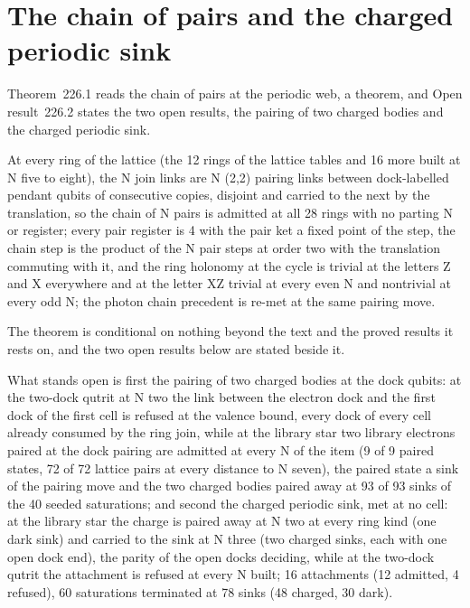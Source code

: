 \section{The chain of pairs and the charged periodic sink}\label{mod:XII-3-chain-of-pairs-and-the-charged-periodic-sink}
\label{narr:open:12-3}Theorem~226.1 reads the chain of pairs at the periodic web, a theorem, and Open result~226.2 states the two open results, the pairing of two charged bodies and the charged periodic sink.
\begin{chtheorem}\label{box:XII-3-chain-of-pairs-and-the-charged-periodic-sink:1}
At every ring of the lattice (the 12 rings of the lattice tables and 16 more built at N five to eight), the N join links are N (2,2) pairing links between dock-labelled pendant qubits of consecutive copies, disjoint and carried to the next by the translation, so the chain of N pairs is admitted at all 28 rings with no parting N or register; every pair register is 4 with the pair ket a fixed point of the step, the chain step is the product of the N pair steps at order two with the translation commuting with it, and the ring holonomy at the cycle is trivial at the letters Z and X everywhere and at the letter XZ trivial at every even N and nontrivial at every odd N; the photon chain precedent is re-met at the same pairing move.
\end{chtheorem}
The theorem is conditional on nothing beyond the text and the proved results it rests on, and the two open results below are stated beside it.
\begin{chwall}\label{box:XII-3-chain-of-pairs-and-the-charged-periodic-sink:2}
What stands open is first the pairing of two charged bodies at the dock qubits: at the two-dock qutrit at N two the link between the electron dock and the first dock of the first cell is refused at the valence bound, every dock of every cell already consumed by the ring join, while at the library star two library electrons paired at the dock pairing are admitted at every N of the item (9 of 9 paired states, 72 of 72 lattice pairs at every distance to N seven), the paired state a sink of the pairing move and the two charged bodies paired away at 93 of 93 sinks of the 40 seeded saturations; and second the charged periodic sink, met at no cell: at the library star the charge is paired away at N two at every ring kind (one dark sink) and carried to the sink at N three (two charged sinks, each with one open dock end), the parity of the open docks deciding, while at the two-dock qutrit the attachment is refused at every N built; 16 attachments (12 admitted, 4 refused), 60 saturations terminated at 78 sinks (48 charged, 30 dark).
\end{chwall}
